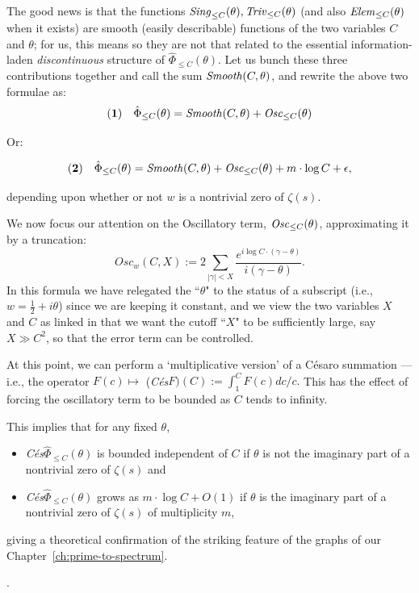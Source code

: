 \documentclass[openany]{book}
\theoremstyle{plain}
\theoremstyle{definition}
\begin{document}
{                     The good news is that  the functions ${\it Sing}_{\le C}(\theta),  {\it Triv}_{\le C}(\theta)$ (and also ${\it Elem}_{\le C}(\theta)$ when it exists) are smooth (easily describable) functions of the two variables $C$ and $\theta$; for us, this means so they are not that related to the essential information-laden {\it discontinuous} structure of  $ {\hat \Phi}_{\le C}(\theta)$. Let us bunch these three contributions together and call the sum ${\it Smooth}(C,\theta)$, and rewrite the above two formulae as:
                       $$ {\bf(1)}\ \ \ {\hat \Phi}_{\le C}(\theta) ={\it Smooth}(C,\theta) +  {\it Osc}_{\le C}(\theta) $$

           Or:

           $${\bf(2)}\ \ \ {\hat \Phi}_{\le C}(\theta) = {\it Smooth}(C,\theta)+  {\it Osc}_{\le C}(\theta) +  m\cdot \log C +\epsilon,$$

           depending upon whether or not $w$ is a nontrivial zero of $\zeta(s)$.


 We now focus our attention on the Oscillatory term,  ${\it Osc}_{\le C}(\theta) $, approximating it by a truncation:  $$Osc_w(C,X):=  2\sum_{|\gamma| <
 X} {{\frac{e^{i\log C\cdot (\gamma-\theta)}}{i(\gamma-\theta)}}}.$$ In this formula we have relegated the ``$\theta$" to the status of  a subscript (i.e., $w = {\frac{1}{2}} +i\theta$) since we are keeping it constant, and we view the two variables $X$ and $C$ as linked in that we want the cutoff ``$X$" to be sufficiently large, say $X \gg C^2$, so that the error term can be controlled.

 At this point, we can perform a `multiplicative version' of  a C{\'e}saro summation ---i.e.,  the operator $F(c) \mapsto$ ({\it C{\'e}s}$F)(C):= \int_1^CF(c) dc/c.$
This has the effect of forcing the oscillatory term to be bounded as $C$ tends to infinity.

 This implies that for any fixed $\theta$,  \begin{itemize} \item {\it C{\'e}s}${\hat \Phi}_{\le C}(\theta)$  is bounded independent of $C$  if  $\theta$ is not the imaginary part of a nontrivial zero of $\zeta(s)$  and
 \item {\it C{\'e}s}${\hat \Phi}_{\le C}(\theta)$ grows as $m\cdot \log C +O(1)$ if $\theta$ is the imaginary part of a nontrivial zero of $\zeta(s)$ of multiplicity $m$, \end{itemize} giving a theoretical confirmation of the striking feature of the graphs of our Chapter~\ref{ch:prime-to-spectrum}.}.
\end{document}
